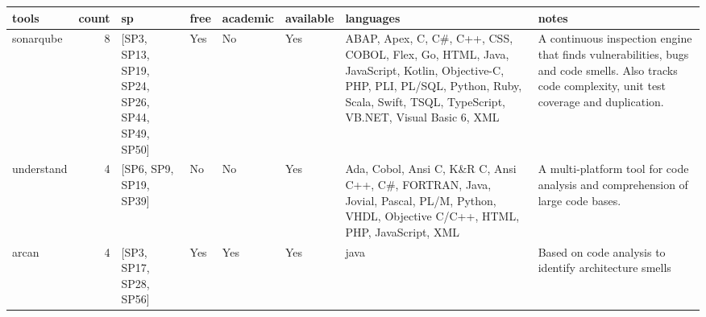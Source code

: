 \begin{tabular}{lrllllll}
\toprule
               tools &  count &                                                     sp &  free & academic & available &                                                                                                                                                                               languages &                                                                                                                                                                                                                                                                                                                                                                                                            notes \\
\midrule
           sonarqube &      8 &        [SP3, SP13, SP19, SP24, SP26, SP44, SP49, SP50] &   Yes &       No &       Yes &  ABAP, Apex, C, C\#, C++, CSS, COBOL, Flex, Go, HTML, Java, JavaScript, Kotlin, Objective-C, PHP, PLI, PL/SQL, Python, Ruby, Scala, Swift, TSQL, TypeScript, VB.NET, Visual Basic 6, XML &                                                                                                                                                                                                                                                                A continuous inspection engine that finds vulnerabilities, bugs and code smells. Also tracks code complexity, unit test coverage and duplication. \\
          understand &      4 &                                 [SP6, SP9, SP19, SP39] &    No &       No &       Yes &                                                 Ada, Cobol, Ansi C, K\&R C, Ansi C++, C\#, FORTRAN, Java, Jovial, Pascal, PL/M, Python, VHDL, Objective C/C++, HTML, PHP, JavaScript, XML &                                                                                                                                                                                                                                                                                                                                   A multi-platform tool for code analysis and comprehension of large code bases. \\
               arcan &      4 &                                [SP3, SP17, SP28, SP56] &   Yes &      Yes &       Yes &                                                                                                                                                                                    java &                                                                                                                                                                                                                                                                                                                                                           Based on code analysis to identify architecture smells \\

\end{tabular}
